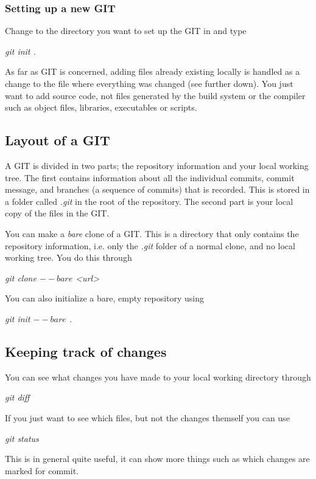 \documentclass[twoside, 11pt, a4paper]{article}
\begin{document}
\subsubsection*{Setting up a new GIT}
Change to the directory you want to set up the GIT in and type \\
\begin{center}\emph{git init .}\end{center}
As far as GIT is concerned, adding files already existing 
locally is handled as a change to the file where everything was changed
(see further down). You just want to add source code, not files generated
by the build system or the compiler such as object files, libraries,
executables or scripts.

\subsection*{Layout of a GIT}
A GIT is divided in two parts; the repository information and your
local working tree. The first contains information about all the individual
commits, commit message, and branches (a sequence of commits) that is
recorded. This is stored in a folder called \emph{.git} in the root of the
repository. The second part is your local copy of the files in the GIT.

You can make a \emph{bare} clone of a GIT. This is a directory that only
contains the repository information, i.e. only the \emph{.git} folder of a
normal clone, and no local working tree. You do this through
\begin{center}\emph{git clone $--bare$ <url>}\end{center}
You can also initialize a bare, empty repository using
\begin{center}\emph{git init $--bare$ .}\end{center}

\subsection*{Keeping track of changes}
You can see what changes you have made to your local
working directory through
\begin{center}\emph{git diff}\end{center}
If you just want to see which files, but not the changes themself
you can use
\begin{center}\emph{git status}\end{center}
This is in general quite useful, it can show more things such
as which changes are marked for commit.
\end{document}
